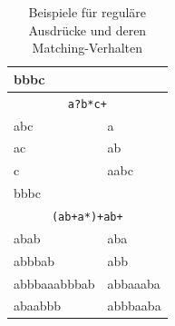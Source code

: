 \begin{table}[p]
\begin{center}
\begin{tabular}{ll}
      bbbc & \\
    \hline
      \multicolumn{2}{c}{\texttt{a?b*c+}} \\
    \hline
      abc & a \\
      ac & ab \\
      c & aabc \\
      bbbc & \\
    \hline
      \multicolumn{2}{c}{\texttt{(ab+a*)+ab+}} \\
    \hline
      abab & aba \\
      abbbab & abb \\
      abbbaaabbbab & abbaaaba \\
      abaabbb & abbbaaba \\
    \hline \hline
  \end{tabular}
  \caption{Beispiele für reguläre Ausdrücke und deren Matching-Verhalten}
  \label{tab:regex_examples}
 \end{center}
\end{table}

